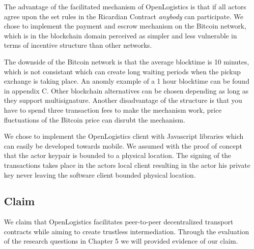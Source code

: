 The advantage of the facilitated mechanism of OpenLogistics is that if all actors agree upon the set rules in the Ricardian Contract \textit{anybody} can participate. We chose to implement the payment and escrow mechanism on the Bitcoin network, which is in the blockchain domain perceived as simpler and less vulnerable in terms of incentive structure than other networks. \par
The downside of the Bitcoin network is that the average blocktime is 10 minutes, which is not consistant which can create long waiting periods when the pickup exchange is taking place. An anomly example of a 1 hour blocktime can be found in appendix C. Other blockchain alternatives can be chosen depending as long as they support multisignature. Another disadvantage of the structure is that you have to spend three transaction fees to make the mechanism work, price fluctuations of the Bitcoin price can disrubt the mechanism.\par
We chose to implement the OpenLogistics client with Javascript libraries which can easily be developed towards mobile. We assumed with the proof of concept that the actor keypair is bounded to a physical location. The signing of the transactions takes place in the actors local client resulting in the actor his private key never leaving the software client bounded physical location.

\subsection{Claim}

We claim that OpenLogistics facilitates peer-to-peer decentralized transport contracts while aiming to create trustless intermediation. Through the evaluation of the research questions in Chapter 5 we will provided evidence of our claim.
